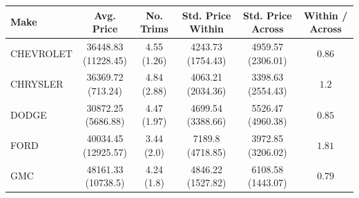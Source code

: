 \begin{tabular}{lccccc}
\toprule
Make & Avg. Price & No. Trims & Std. Price Within & Std. Price Across & Within / Across \\
\midrule
CHEVROLET & \makecell{36448.83 \\ (11228.45)\\[0.25em]} & \makecell{4.55 \\ (1.26)\\[0.25em]} & \makecell{4243.73 \\ (1754.43)\\[0.25em]} & \makecell{4959.57 \\ (2306.01)\\[0.25em]} & $0.86$ \\
CHRYSLER & \makecell{36369.72 \\ (713.24)\\[0.25em]} & \makecell{4.84 \\ (2.88)\\[0.25em]} & \makecell{4063.21 \\ (2034.36)\\[0.25em]} & \makecell{3398.63 \\ (2554.43)\\[0.25em]} & $1.2$ \\
DODGE & \makecell{30872.25 \\ (5686.88)\\[0.25em]} & \makecell{4.47 \\ (1.97)\\[0.25em]} & \makecell{4699.54 \\ (3388.66)\\[0.25em]} & \makecell{5526.47 \\ (4960.38)\\[0.25em]} & $0.85$ \\
FORD & \makecell{40034.45 \\ (12925.57)\\[0.25em]} & \makecell{3.44 \\ (2.0)\\[0.25em]} & \makecell{7189.8 \\ (4718.85)\\[0.25em]} & \makecell{3972.85 \\ (3206.02)\\[0.25em]} & $1.81$ \\
GMC & \makecell{48161.33 \\ (10738.5)\\[0.25em]} & \makecell{4.24 \\ (1.8)\\[0.25em]} & \makecell{4846.22 \\ (1527.82)\\[0.25em]} & \makecell{6108.58 \\ (1443.07)\\[0.25em]} & $0.79$ \\

\end{tabular}
